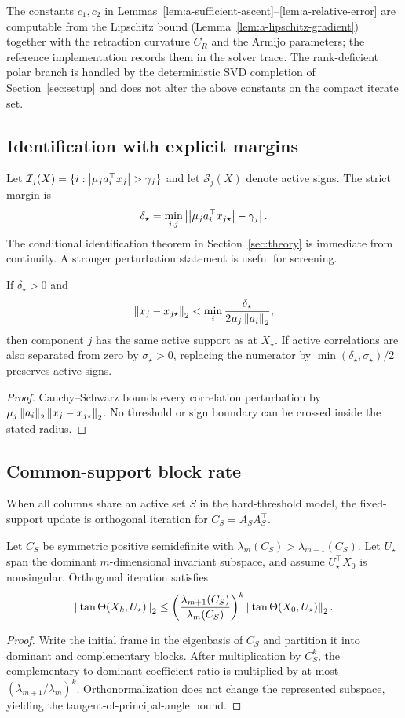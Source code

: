 The constants $c_1,c_2$ in Lemmas~\ref{lem:a-sufficient-ascent}--\ref{lem:a-relative-error} are computable from the Lipschitz bound (Lemma~\ref{lem:a-lipschitz-gradient}) together with the retraction curvature $C_R$ and the Armijo parameters; the reference implementation records them in the solver trace. The rank-deficient polar branch is handled by the deterministic SVD completion of Section~\ref{sec:setup} and does not alter the above constants on the compact iterate set.

\subsection{Identification with explicit margins}
Let $\mathcal I_j(X)=\{i:\left\lvert \mu_j a_i^\top x_j \right\rvert>\gamma_j\}$ and let $\mathcal S_j(X)$ denote active signs. The strict margin is
\[
\delta_\star=\min_{i,j}\left|\left\lvert \mu_j a_i^\top x_{j\star} \right\rvert-\gamma_j\right|.
\]
The conditional identification theorem in Section~\ref{sec:theory} is immediate from continuity. A stronger perturbation statement is useful for screening.

\begin{corollary}
\label{cor:a-support-radius}
If $\delta_\star>0$ and
\[
\left\lVert x_j-x_{j\star} \right\rVert_2<\min_i\frac{\delta_\star}{2\mu_j\left\lVert a_i \right\rVert_2},
\]
then component $j$ has the same active support as at $X_\star$. If active correlations are also separated from zero by $\sigma_\star>0$, replacing the numerator by $\min(\delta_\star,\sigma_\star)/2$ preserves active signs.
\end{corollary}
\begin{proof}
Cauchy--Schwarz bounds every correlation perturbation by $\mu_j\left\lVert a_i \right\rVert_2\left\lVert x_j-x_{j\star} \right\rVert_2$. No threshold or sign boundary can be crossed inside the stated radius.
\end{proof}

\subsection{Common-support block rate}
When all columns share an active set $S$ in the hard-threshold model, the fixed-support update is orthogonal iteration for $C_S=A_SA_S^\top$.

\begin{theorem}
\label{thm:a-block-rate}
Let $C_S$ be symmetric positive semidefinite with $\lambda_m(C_S)>\lambda_{m+1}(C_S)$. Let $U_\star$ span the dominant $m$-dimensional invariant subspace, and assume $U_\star^\top X_0$ is nonsingular. Orthogonal iteration satisfies
\[
\left\lVert \tan\Theta(X_{k},U_\star) \right\rVert_2
\le
\left(\frac{\lambda_{m+1}(C_S)}{\lambda_m(C_S)}\right)^k
\left\lVert \tan\Theta(X_{0},U_\star) \right\rVert_2.
\]
\end{theorem}
\begin{proof}
Write the initial frame in the eigenbasis of $C_S$ and partition it into dominant and complementary blocks. After multiplication by $C_S^k$, the complementary-to-dominant coefficient ratio is multiplied by at most $(\lambda_{m+1}/\lambda_m)^k$. Orthonormalization does not change the represented subspace, yielding the tangent-of-principal-angle bound.
\end{proof}

